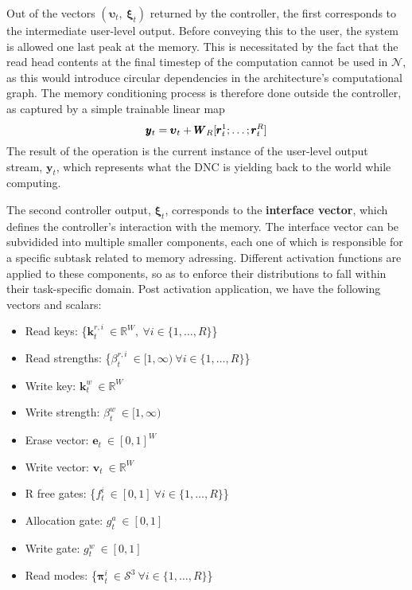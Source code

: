 \documentclass[]{article}
\begin{document}
Out of the vectors $(\pmb{\upsilon}_t,\ \pmb{\xi}_t)$ returned by the controller, the first corresponds to the intermediate user-level output. Before conveying this to the user, the system is allowed one last peak at the memory. This is necessitated by the fact that the read head contents at the final timestep of the computation cannot be used in $\mathcal{N}$, as this would introduce circular dependencies in the architecture's computational graph. The memory conditioning process is therefore done outside the controller, as captured by a simple trainable linear map \begin{equation}
\notag
\pmb{y}_t = \pmb{\upsilon}_t + \pmb{W}_R[\pmb{r}_{t}^1;\dots;\pmb{r}_{t}^R]
\label{eqn:Memory Conditioning}
\end{equation}
The result of the operation is the current instance of the user-level output stream, $\pmb{y}_t$, which represents what the DNC is yielding back to the world while computing. 

The second controller output, $\pmb{\xi}_t$, corresponds to the \textbf{interface vector}, which defines the controller's interaction with the memory. The interface vector can be subvidided into multiple smaller components, each one of which is responsible for a specific subtask related to memory adressing. Different activation functions are applied to these components, so as to enforce their distributions to fall within their task-specific domain. Post activation application, we have the following vectors and scalars:

\vspace{10pt}
\hspace{-40pt}
\begin{minipage}{0.6\textwidth}
\begin{itemize}
\item Read keys: \{$\pmb{k}_t^{r,i} \ \in \mathbb{R}^W, \ \forall i \in \{1,\dots,R\}$\}
\item Read strengths: \{$\beta_t^{r,i} \ \in [1, \infty) \ \forall i \in \{1,\dots,R\}$\}
\item Write key: $\pmb{k}_t^w \ \in \mathbb{R}^W$
\item Write strength: $\beta_t^w \ \in [1, \infty)$
\item Erase vector: $\pmb{e}_t \ \in [0,1]^W$
\end{itemize}
\end{minipage}
\hspace{-20pt}
\begin{minipage}{0.5\textwidth}
\begin{itemize}
\item Write vector: $\pmb{v}_t \ \in \mathbb{R}^W$
\item R free gates: \{$f_t^i \ \in [0,1] \ \forall i \in \{1,\dots,R\}$\}
\item Allocation gate: $g_t^a \ \in [0,1]$
\item Write gate: $g_t^w \ \in [0,1]$
\item Read modes: \{$\pmb{\pi}_t^i \ \in \mathcal{S}^3 \ \forall i \in \{1,\dots,R\}$\}
\end{itemize}
\end{minipage}
\vspace{10pt}
\end{document}
